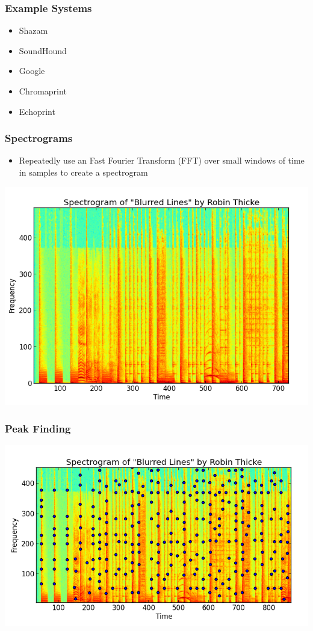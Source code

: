 \documentclass{beamer}
\begin{document}

\begin{frame}
\frametitle{Example Systems}
\begin{itemize}
    \item Shazam
    \item SoundHound
    \item Google
    \item Chromaprint
    \item Echoprint
\end{itemize}
\end{frame}


\begin{frame}
\frametitle{Spectrograms}
\begin{itemize}
    \item Repeatedly use an Fast Fourier Transform (FFT) over small windows of time in samples to create a spectrogram
\end{itemize}
\begin{center}
    \includegraphics[width=0.75\linewidth]{pics/spectrogram}
\end{center}
\end{frame}


\begin{frame}
\frametitle{Peak Finding}
\begin{center}
    \includegraphics[width=\linewidth]{pics/spectrogram_peaks}
\end{center}
\end{frame}
\end{document}
